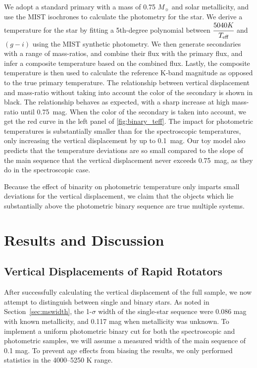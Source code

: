 \documentclass[twocolumn]{aastex6}
\newcommand{\Teff}{\ensuremath{T_{\textrm{eff}}}}
\begin{document}
We adopt a standard primary with a mass of 0.75 \(M_\sun\) and solar metallicity, 
and use the MIST isochrones to calculate the photometry for the star. We
derive a temperature for the star by fitting a 5th-degree polynomial between
\(\cfrac{5040 K}{\Teff}\) and \((g-i)\) using the MIST synthetic photometry. We
then generate secondaries with a range of mass-ratios, and combine their flux
with the primary flux, and infer a composite temperature based on the combined
flux. Lastly, the composite temperature is then used to calculate the reference
K-band magnitude as opposed to the true primary temperature. The relationship
between vertical displacement and mass-ratio without taking into account the
color of the secondary is shown in black. The relationship behaves as expected,
with a sharp increase at high mass-ratio until 0.75~mag. When the color of the 
secondary is taken into account, we get the red curve in the left panel of 
\cref{fig:binary_teff}. The impact for photometric temperatures is
substantially smaller than for the spectroscopic temperatures, only increasing
the vertical displacement by up to 0.1~mag. Our toy model also predicts that
the temperature deviations are so small compared to the slope of the main
sequence that the vertical displacement never exceeds 0.75~mag, as they do in
the spectroscopic case.

Because the effect of binarity on photometric temperature only imparts small 
deviations for the vertical displacement, we claim that the objects which lie
substantially above the photometric binary sequence are true multiple systems. 


\section{Results and Discussion}
\label{sec:results}

\subsection{Vertical Displacements of Rapid Rotators}
\label{sec:elbadry}

After successfully calculating the vertical displacement of the full sample, we
now attempt to distinguish between single and binary stars. As noted in
Section~\ref{sec:mswidth}, the 1-\(\sigma\) width of the single-star sequence 
were 0.086 mag with known metallicity, and 0.117 mag when metallicity was unknown. 
To implement a uniform photometric binary cut for both the spectroscopic and
photometric samples, we will assume a measured width of the main sequence of 
0.1 mag. To prevent age effects 
from biasing the results, we only performed statistics in the 4000--5250 K 
range.
\end{document}
